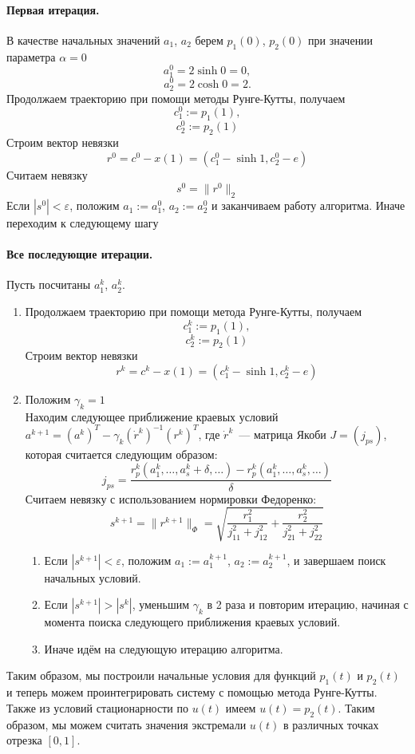 \documentclass[24pt]{article}
\begin{document}
\paragraph{Первая итерация.}

В качестве начальных значений $a_1$, $a_2$ берем $p_1(0)$, $p_2(0)$ при значении параметра $\alpha = 0$
$$ a_1^0 = 2\sinh 0 = 0,$$ $$a_2^0 = 2\cosh 0 = 2.$$
Продолжаем траекторию при помощи методы Рунге-Кутты, получаем
$$c_1^0 := p_1(1),$$ $$c_2^0 := p_2(1)$$
Строим вектор невязки
$$r^0 = c^0 - x(1) = \left(c_1^0 - \sinh 1, c_2^0 - e\right)$$
Считаем невязку
$$s^0 = \|r^0\|_2$$
Если $\left|s^0\right| < \varepsilon$, положим $a_1 := a_1^0$, $a_2 := a_2^0$ и заканчиваем работу алгоритма. Иначе переходим к следующему шагу
\paragraph{Все последующие итерации.}
Пусть посчитаны $a_1^k$, $a_2^k$.
\begin{enumerate}
\item
Продолжаем траекторию при помощи метода Рунге-Кутты, получаем
$$c_1^k := p_1(1),$$ $$c_2^k := p_2(1)$$
Строим вектор невязки
$$r^k = c^k - x(1) = \left(c_1^k - \sinh 1, c_2^k - e\right)$$
\item
Положим $\gamma_k = 1$\\
Находим следующее приближение краевых условий
$a^{k+1} = \left(a^k\right)^T - \gamma_k\left(\dot r^k\right)^{-1}\left(r^k\right)^T$, где
$\dot r^k$~--- матрица Якоби $J = \left(j_{ps}\right)$, которая считается следующим образом:
$$j_{ps} = \frac{r^k_p\left(a^k_1,\ldots,a_s^k + \delta, \ldots\right) - r^k_p\left(a^k_1,\ldots,a_s^k, \ldots\right)}{\delta}$$
Считаем невязку с использованием нормировки Федоренко:
$$s^{k+1} = \|r^{k+1}\|_\Phi = \sqrt{\frac{r_1^2}{j_{11}^2+j_{12}^2} + \frac{r_2^2}{j_{21}^2+j_{22}^2} }$$
\begin{enumerate}
\item
Если $\left|s^{k+1}\right| < \varepsilon$, положим $a_1 := a_1^{k+1}$, $a_2 := a_2^{k+1}$, и завершаем поиск начальных условий.
\item
Если $\left|s^{k+1}\right| > \left|s^{k}\right|$, уменьшим $\gamma_k$ в 2 раза и повторим итерацию, начиная с момента поиска следующего приближения краевых условий. 
\item
Иначе идём на следующую итерацию алгоритма.
\end{enumerate}
\end{enumerate}
Таким образом, мы построили начальные условия для функций $p_1(t)$ и $p_2(t)$ и теперь можем проинтегрировать систему с помощью метода Рунге-Кутты.\\
Также из условий стационарности по $u(t)$ имеем $u(t) = p_2(t)$. Таким образом, мы можем считать значения экстремали $u(t)$ в различных точках отрезка $[0,1]$.
\end{document}

